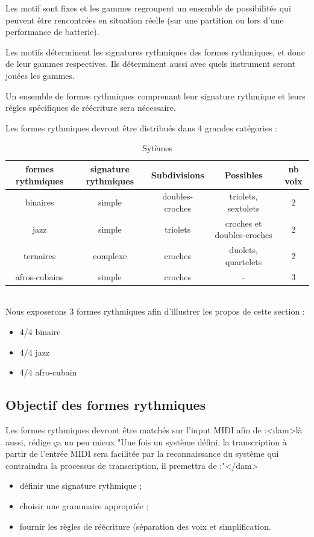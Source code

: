 Les motif sont fixes et les gammes regroupent un ensemble de possibilités qui
peuvent être rencontrées en situation réelle (sur une partition ou lors d’une
performance de batterie).

Les motifs déterminent les signatures rythmiques des formes rythmiques, et donc
de leur gammes respectives. Ils déterminent aussi avec quels instrument seront
jouées les gammes.

Un ensemble de formes rythmiques comprenant leur signature rythmique et leurs
règles spécifiques de réécriture sera nécessaire. 

Les formes rythmiques devront être distribués dans 4 grandes catégories :
\begin{table}[h]
	\centering
	\begin{tabular}{|c|c|c|c|c|} \hline
		formes rythmiques & signature rythmiques & Subdivisions & Possibles & nb voix \\ \hline
		binaires & simple & doubles-croches & triolets, sextolets & 2 \\
		jazz & simple & triolets & croches et doubles-croches & 2 \\
		ternaires & complexe & croches & duolets, quartelets & 2 \\
		afros-cubains & simple & croches & - & 3 \\ \hline
	\end{tabular}
	\caption{Sytèmes}
\end{table}\\
Nous exposerons 3 formes rythmiques afin d’illustrer les propos de cette section :
\begin{itemize}
	\item 4/4 binaire 
	\item 4/4 jazz
	\item 4/4 afro-cubain
\end{itemize}
\subsection*{Objectif des formes rythmiques}
Les formes rythmiques devront être matchés sur l’input MIDI afin de :<dam>là aussi, rédige ça un peu mieux
"Une fois un système défini, la transcription à partir de l'entrée MIDI sera facilitée par la reconnaissance du système qui contraindra la processus de transcription, il premettra de :"</dam>
\begin{itemize}
	\item définir une signature rythmique ;
	\item choisir une grammaire appropriée ;
	\item fournir les règles de réécriture (séparation des voix et simplification.\\
\end{itemize}

